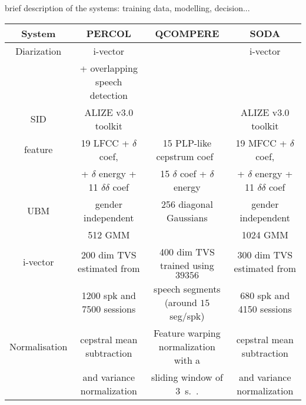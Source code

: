 brief description of the systems: training data, modelling, decision...

\begin{table*}[t]
  \centering
  \begin{tabular}{|c|c|c|c|}
    \hline
    System          & PERCOL                                        & QCOMPERE                                        & SODA      \\
    \hline    
    Diarization     & i-vector \cite{charlet2013}                   &                                                 &  i-vector \cite{dupuy2014}         \\
                    & + overlapping speech detection                &                                                 &           \\
    \hline    
    SID             & ALIZE v3.0 toolkit \cite{larcher2013}         &                                                 &  ALIZE v3.0 toolkit \cite{larcher2013}  \\
    \hline    
    feature         & 19 LFCC + $\delta$ coef,                      & 15 PLP-like cepstrum coef~\cite{Hermansky1990}  &  19 MFCC + $\delta$ coef,         \\
                    & + $\delta$ energy + 11 $\delta$$\delta$ coef  & 15 $\delta$ coef + $\delta$ energy              &  + $\delta$ energy + 11 $\delta$$\delta$ coef  \\
    \hline    
    UBM             & gender independent                            & 256 diagonal Gaussians                          &  gender independent         \\
                    & 512 GMM                                       &                                                 &  1024 GMM         \\
    \hline    
    i-vector        & 200 dim TVS estimated from                    & 400 dim TVS trained using $39356$               &  300 dim TVS estimated from         \\
                    & 1200 spk and 7500 sessions                    & speech segments (around $15$ seg/spk)           &  680 spk and 4150 sessions         \\
    \hline    
    Normalisation   & cepstral mean subtraction                     & Feature warping normalization with a            &  cepstral mean subtraction         \\
                    & and variance normalization                    & sliding window of $3$~s.~\cite{Pelecanos2001}.  &   and variance normalization        \\

\end{tabular}
\end{table*}
